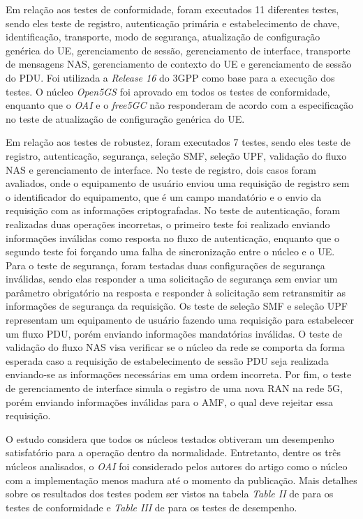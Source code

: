 Em relação aos testes de conformidade, foram executados 11 diferentes testes, sendo eles teste de registro, autenticação primária e estabelecimento de chave, identificação, transporte, modo de segurança, atualização de configuração genérica do UE, gerenciamento de sessão, gerenciamento de interface, transporte de mensagens NAS, gerenciamento de contexto do UE e gerenciamento de sessão do PDU.
Foi utilizada a \textit{Release 16} do 3GPP como base para a execução dos testes.
O núcleo \textit{Open5GS} foi aprovado em todos os testes de conformidade, enquanto que o \textit{OAI} e o \textit{free5GC} não responderam de acordo com a especificação no teste de atualização de configuração genérica do UE.

Em relação aos testes de robustez, foram executados 7 testes, sendo eles teste de registro, autenticação, segurança, seleção SMF, seleção UPF, validação do fluxo NAS e gerenciamento de interface.
No teste de registro, dois casos foram avaliados, onde o equipamento de usuário enviou uma requisição de registro sem o identificador do equipamento, que é um campo mandatório e o envio da requisição com as informações criptografadas.
No teste de autenticação, foram realizadas duas operações incorretas, o primeiro teste foi realizado enviando informações inválidas como resposta no fluxo de autenticação, enquanto que o segundo teste foi forçando uma falha de sincronização entre o núcleo e o UE.
Para o teste de segurança, foram testadas duas configurações de segurança inválidas, sendo elas responder a uma solicitação de segurança sem enviar um parâmetro obrigatório na resposta e responder à solicitação sem retransmitir as informações de segurança da requisição.
Os teste de seleção SMF e seleção UPF representam um equipamento de usuário fazendo uma requisição para estabelecer um fluxo PDU, porém enviando informações mandatórias inválidas.
O teste de validação do fluxo NAS visa verificar se o núcleo da rede se comporta da forma esperada caso a requisição de estabelecimento de sessão PDU seja realizada enviando-se as informações necessárias em uma ordem incorreta.
Por fim, o teste de gerenciamento de interface simula o registro de uma nova RAN na rede 5G, porém enviando informações inválidas para o AMF, o qual deve rejeitar essa requisição. 

O estudo considera que todos os núcleos testados obtiveram um desempenho satisfatório para a operação dentro da normalidade. Entretanto, dentre os três núcleos analisados, o \textit{OAI} foi considerado pelos autores do artigo como o núcleo com a implementação menos madura até o momento da publicação.
Mais detalhes sobre os resultados dos testes podem ser vistos na tabela \textit{Table II} de \cite[p.~10]{Dominato2021} para os testes de conformidade e \textit{Table III} de \cite[p.~11]{Dominato2021} para os testes de desempenho.

